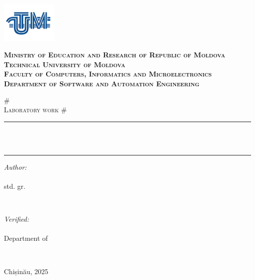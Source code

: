 \makeatletter
\begin{titlepage}
\centering

\includegraphics[height=2cm]{utm_logo.png}

\bfseries
\textsc{Ministry of Education and Research of Republic of Moldova} \\
\textsc{Technical University of Moldova} \\
\textsc{Faculty of Computers, Informatics and Microelectronics} \\
\textsc{Department of Software and Automation Engineering} \\
\mdseries

\vfill

\textsc{\Large \#\@labsubject} \\
\textsc{\large Laboratory work \#\@labno}\\[0.5cm]

\vspace{12pt}
\newcommand{\HRule}{\rule{\linewidth}{0.5mm}}
\HRule \\[0.2cm]
{ \LARGE \bfseries \@title }\\[0.4cm]
\HRule
\vfill

\begin{minipage}[t]{0.4\textwidth}
\begin{flushleft} \large
\emph{Author:} \\
\@author\\                        
std. gr. \@group
\end{flushleft}
\end{minipage}
~
\begin{minipage}[t]{0.4\textwidth}
\raggedleft \large
\emph{Verified:} \\
\@prof \\
Department of \textsc{\@profdep}
\end{minipage}\\[3cm]
\vfill

Chișinău, 2025
\end{titlepage}
\makeatother
\setcounter{page}{2}
